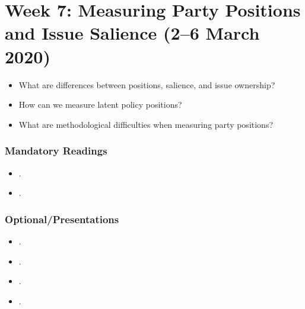 \documentclass[abstract=on,parskip=full,headings=standardclasses,fontsize=11pt,paper=a4]{scrartcl}
\begin{document}
\section{Week 7:   Measuring Party Positions and Issue Salience (2--6 March 2020)}


\begin{itemize}
\renewcommand\labelitemi{--}
\item What are differences between positions, salience, and issue ownership?
\item How can we measure latent policy positions? 
\item What are methodological difficulties when measuring party positions?
\end{itemize}

\subsubsection*{Mandatory Readings}
\begin{itemize}
\item {}.
\item {}.
\end{itemize}


\subsubsection*{Optional/Presentations}
\begin{itemize}
\item {}.
\item {}.
\item {}.
\item {}.
\end{itemize}
\end{document}
